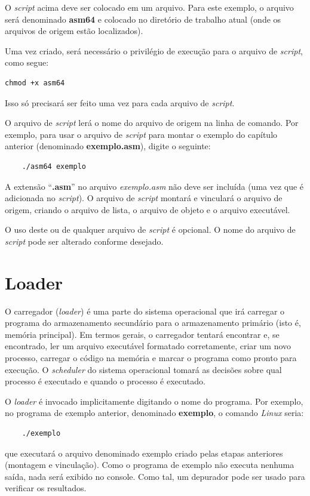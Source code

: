 O \textit{script} acima deve ser colocado em um arquivo. Para este exemplo, o arquivo será denominado \textbf{asm64} e colocado no diretório de trabalho atual (onde os arquivos de origem estão localizados).

Uma vez criado, será necessário o privilégio de execução para o arquivo de \textit{script}, como segue:
\begin{center}
	\begin{verbatim}
chmod +x asm64
\end{verbatim}
\end{center}

Isso só precisará ser feito uma vez para cada arquivo de \textit{script}.

O arquivo de \textit{script} lerá o nome do arquivo de origem na linha de comando. Por exemplo, para usar o arquivo de \textit{script} para montar o exemplo do capítulo anterior (denominado \textbf{exemplo.asm}), digite o seguinte:
\begin{center}
	\begin{verbatim}
	./asm64 exemplo
	\end{verbatim}
\end{center}

A extensão ``\textbf{.asm}'' no arquivo \textit{exemplo.asm} não deve ser incluída (uma vez que é adicionada no \textit{script}). O arquivo de \textit{script} montará e vinculará o arquivo de origem, criando o arquivo de lista, o arquivo de objeto e o arquivo executável.

O uso deste ou de qualquer arquivo de \textit{script} é opcional. O nome do arquivo de \textit{script} pode ser alterado conforme desejado.

\section{Loader}
O carregador (\textit{loader}) é uma parte do sistema operacional que irá carregar o programa do armazenamento secundário para o armazenamento primário (isto é, memória principal). Em termos gerais, o carregador tentará encontrar e, se encontrado, ler um arquivo executável formatado corretamente, criar um novo processo, carregar o código na memória e marcar o programa como pronto para execução. O \textit{scheduler} do sistema operacional tomará as decisões sobre qual processo é executado e quando o processo é executado.

O \textit{loader} é invocado implicitamente digitando o nome do programa. Por exemplo, no programa de exemplo anterior, denominado \textbf{exemplo}, o comando \textit{Linux} seria:
\begin{center}
	\begin{verbatim}
	./exemplo
	\end{verbatim}
\end{center}
que executará o arquivo denominado exemplo criado pelas etapas anteriores (montagem e vinculação). Como o programa de exemplo não executa nenhuma saída, nada será exibido no console. Como tal, um depurador pode ser usado para verificar os resultados.

